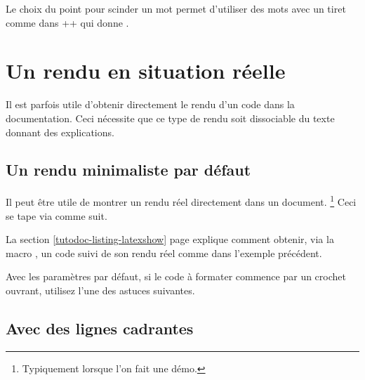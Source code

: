 \begin{tdocrem}
    Le choix du point pour scinder un mot permet d'utiliser des mots avec un tiret comme dans \tdoclatexin++ qui donne .
\end{tdocrem}


\section{Un rendu en situation réelle}
\label{tutodoc-showcase}

Il est parfois utile d'obtenir directement le rendu d'un code dans la documentation. Ceci nécessite que ce type de rendu soit dissociable du texte donnant des explications.



\subsection{Un rendu minimaliste par défaut}

\begin{tdocexa}
    Il peut être utile de montrer un rendu réel directement dans un document.%
    \footnote{
        Typiquement lorsque l'on fait une démo.
    }
    Ceci se tape via  comme suit.

\end{tdocexa}


\begin{tdocrem}
    La section \ref{tutodoc-listing-latexshow} page \pageref{tutodoc-listing-latexshow} explique comment obtenir, via la macro , un code suivi de son rendu réel comme dans l'exemple précédent.
\end{tdocrem}


\begin{tdocwarn}
    Avec les paramètres par défaut, si le code à formater commence par un crochet ouvrant, utilisez l'une des astuces suivantes.

\end{tdocwarn}


\subsection{Avec des lignes cadrantes}

